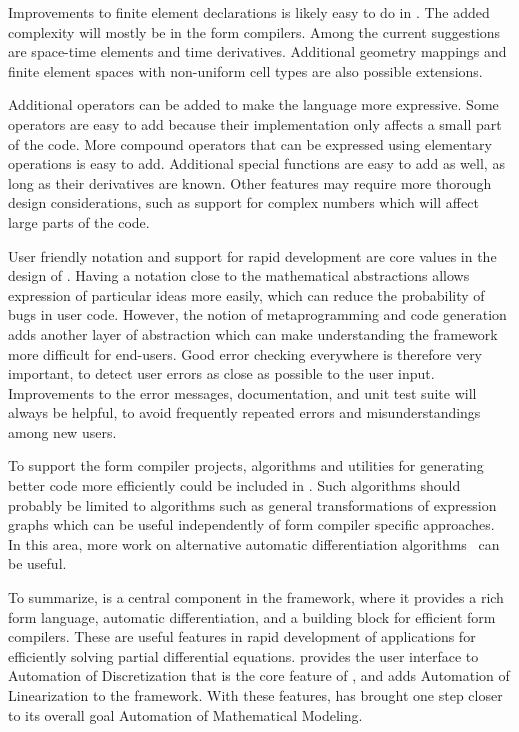 Improvements to finite element declarations is likely easy to do in
\ufl{}. The added complexity will mostly be in the form compilers.
Among the current suggestions are space-time elements and time
derivatives.  Additional geometry mappings and finite element spaces
with non-uniform cell types are also possible extensions.

Additional operators can be added to make the language more
expressive. Some operators are easy to add because their
implementation only affects a small part of the code.  More compound
operators that can be expressed using elementary operations is easy to
add.  Additional special functions are easy to add as well, as long as
their derivatives are known.  Other features may require more thorough
design considerations, such as support for complex numbers which will
affect large parts of the code.

User friendly notation and support for rapid development are core
values in the design of \ufl{}.  Having a notation close to the
mathematical abstractions allows expression of particular ideas more
easily, which can reduce the probability of bugs in user code.
However, the notion of metaprogramming and code generation adds
another layer of abstraction which can make understanding the
framework more difficult for end-users.  Good error checking everywhere
is therefore very important, to detect user errors as close as
possible to the user input. Improvements to the error messages,
documentation, and unit test suite will always be helpful, to avoid
frequently repeated errors and misunderstandings among new users.

To support the form compiler projects, algorithms and utilities for
generating better code more efficiently could be included in \ufl{}.
Such algorithms should probably be limited to algorithms such as
general transformations of expression graphs which can be useful
independently of form compiler specific approaches.
In this area, more work on alternative automatic differentiation
algorithms~\cite{ForTad2004,Tad2008} can be useful.

To summarize, \ufl{} is a central component in the \fenics{}
framework, where it provides a rich form language,
automatic differentiation, and a building block for efficient
form compilers.  These are useful features in rapid
development of applications for efficiently solving partial
differential equations.  \ufl{} provides the user interface
to Automation of Discretization that is the core feature of
\fenics{}, and adds Automation of Linearization to the framework.
With these features, \ufl{} has brought \fenics{} one step closer
to its overall goal Automation of Mathematical Modeling.

